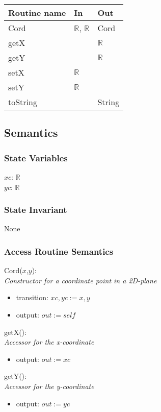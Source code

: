 \documentclass[12pt]{article}
\begin{document}
\begin{tabular}{| l | l | l |}
\hline
\textbf{Routine name} & \textbf{In} & \textbf{Out}\\
\hline
Cord & $\mathbb{R}$, $\mathbb{R}$ & Cord\\
\hline
getX & ~ & $\mathbb{R}$\\
\hline
getY & ~ & $\mathbb{R}$\\
\hline
setX & $\mathbb{R}$ & ~\\
\hline
setY & $\mathbb{R}$ & ~\\
\hline
toString & ~ & String \\
\hline
\end{tabular}

\subsection* {Semantics}

\subsubsection* {State Variables}

$xc$: $\mathbb{R}$\\
$yc$: $\mathbb{R}$

\subsubsection* {State Invariant}

None

\subsubsection* {Access Routine Semantics}

Cord($x$,$y$):\\
\textit{Constructor for a coordinate point in a 2D-plane}
\begin{itemize}
\item transition: $xc, yc := x, y$
\item output: $out := \mathit{self}$
\end{itemize}

\noindent
getX():\\
\textit{Accessor for the x-coordinate}
\begin{itemize}
\item output: $out := xc$
\end{itemize}

\noindent
getY():\\
\textit{Accessor for the y-coordinate}
\begin{itemize}
\item output: $out := yc$
\end{itemize}
\end{document}

